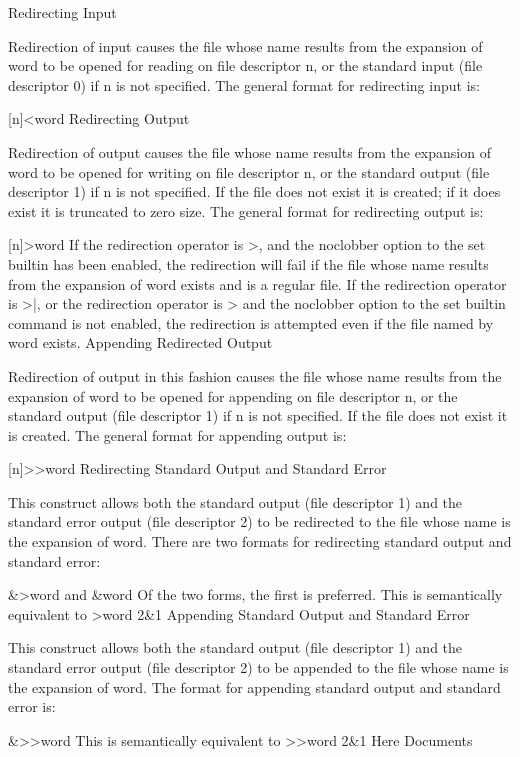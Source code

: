 \documentclass[11pt]{article}
\begin{document}
{{{Redirecting Input

Redirection of input causes the file whose name results from the expansion of word to be opened for reading on file descriptor n, or the standard input (file descriptor 0) if n is not specified.
The general format for redirecting input is:

[n]<word
Redirecting Output

Redirection of output causes the file whose name results from the expansion of word to be opened for writing on file descriptor n, or the standard output (file descriptor 1) if n is not specified. If the file does not exist it is created; if it does exist it is truncated to zero size.
The general format for redirecting output is:

[n]>word
If the redirection operator is >, and the noclobber option to the set builtin has been enabled, the redirection will fail if the file whose name results from the expansion of word exists and is a regular file. If the redirection operator is >|, or the redirection operator is > and the noclobber option to the set builtin command is not enabled, the redirection is attempted even if the file named by word exists.
Appending Redirected Output

Redirection of output in this fashion causes the file whose name results from the expansion of word to be opened for appending on file descriptor n, or the standard output (file descriptor 1) if n is not specified. If the file does not exist it is created.
The general format for appending output is:

[n]>>word
Redirecting Standard Output and Standard Error

This construct allows both the standard output (file descriptor 1) and the standard error output (file descriptor 2) to be redirected to the file whose name is the expansion of word.
There are two formats for redirecting standard output and standard error:

&>word
and
\&word
Of the two forms, the first is preferred. This is semantically equivalent to
>word 2\&1
Appending Standard Output and Standard Error

This construct allows both the standard output (file descriptor 1) and the standard error output (file descriptor 2) to be appended to the file whose name is the expansion of word.
The format for appending standard output and standard error is:

&>>word
This is semantically equivalent to
>>word 2\&1
Here Documents

}}}
\end{document}
